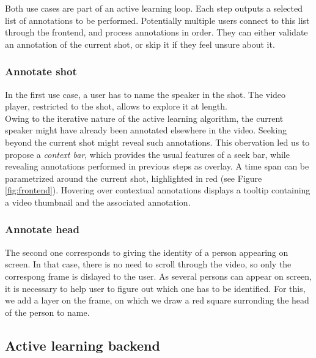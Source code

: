 \documentclass[a4paper]{article}
\begin{document}
Both use cases are part of an active learning loop. Each step outputs a selected list of annotations to be performed. Potentially multiple users connect to this list through the frontend, and process annotations in order. They can either validate an annotation of the current shot, or skip it if they feel unsure about it.



\subsubsection{Annotate shot} \label{sec:shot}
In the first use case, a user has to name the speaker in the shot. The video player, restricted to the shot, allows to explore it at length.\\
Owing to the iterative nature of the active learning algorithm, the current speaker might have already been annotated elsewhere in the video. Seeking beyond the current shot might reveal such annotations. This obervation led us to propose a \emph{context bar}, which provides the usual features of a seek bar, while revealing annotations performed in previous steps as overlay. A time span can be parametrized around the current shot, highlighted in red (see Figure \ref{fig:frontend}). Hovering over contextual annotations displays a tooltip containing a video thumbnail and the associated annotation.\\

\subsubsection{Annotate head} \label{sec:head}
The second one corresponds to giving the identity of a person appearing on screen. In that case, there is no need to scroll through the video, so only the correspong frame is dislayed to the user. As several persons can appear on screen, it is necessary to help user to figure out which one has to be identified. For this, we add a layer on the frame, on which we draw a red square surronding the head of the person to name.\\



      \subsection{Active learning backend}
\end{document}
